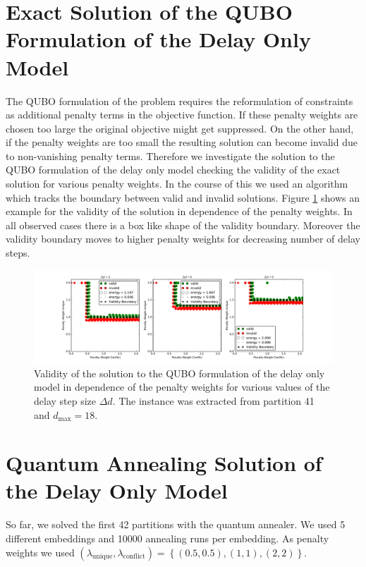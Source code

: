 \documentclass{article}
\begin{document}
\section{Exact Solution of the QUBO Formulation of the Delay Only Model}
The QUBO formulation of the problem requires the reformulation of constraints as additional penalty terms in the objective function.
If these penalty weights are chosen too large the original objective might get suppressed. 
On the other hand, if the penalty weights are too small the resulting solution can become invalid due to non-vanishing penalty terms.
Therefore we investigate the solution to the QUBO formulation of the delay only model checking the validity of the exact solution for various penalty weights.
In the course of this we used an algorithm which tracks the boundary between valid and invalid solutions.
Figure \ref{fig:validityMaps} shows an example for the validity of the solution in dependence of the penalty weights.
In all observed cases there is a box like shape of the validity boundary.
Moreover the validity boundary moves to higher penalty weights for decreasing number of delay steps.
\begin{figure}[htpb]
    \centering
    \includegraphics[width=1.0\linewidth]{pics/validity_maps_examples.pdf}
    \caption{Validity of the solution to the QUBO formulation of the delay only model in dependence of the penalty weights for various values of the delay step size $\Delta d$. The instance was extracted from partition 41 and $d_\text{max}=18$.}
    \label{fig:validityMaps}
\end{figure}
\section{Quantum Annealing Solution of the Delay Only Model}
So far, we solved the first 42 partitions with the quantum annealer.
We used 5 different embeddings and 10000 annealing runs per embedding.
As penalty weights we used $(\lambda_\text{unique}, \lambda_\text{conflict}) = \left\{(0.5, 0.5), (1, 1), (2, 2)\right\}$.
\end{document}
